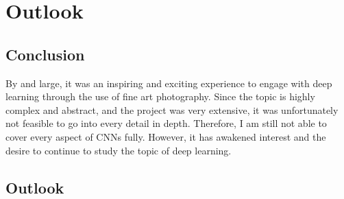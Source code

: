 \chapter{Outlook}
\label{ch:outlook}

\section{Conclusion}

By and large, it was an inspiring and exciting experience to engage with deep learning through the use of fine art photography. Since the topic is highly complex and abstract, and the project was very extensive, it was unfortunately not feasible to go into every detail in depth. Therefore, I am still not able to cover every aspect of CNNs fully. However, it has awakened interest and the desire to continue to study the topic of deep learning.

\section{Outlook}

